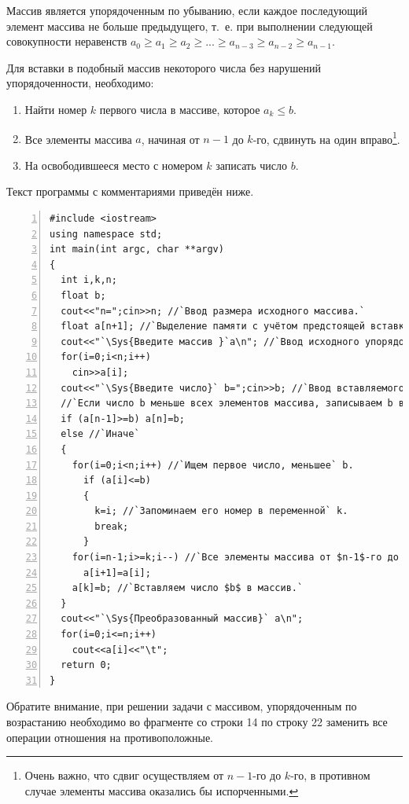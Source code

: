 Массив является упорядоченным по убыванию, если каждое последующий элемент массива не больше предыдущего, т.~е. при
выполнении следующей совокупности неравенств $a_0\geqslant a_1\geqslant a_2\geqslant ...\geqslant a_{n-3}\geqslant a_{n-2}\geqslant a_{n-1}$. 

Для вставки в подобный массив некоторого числа без нарушений упорядоченности, необходимо:

\begin{enumerate}
\item Найти номер $k$ первого числа в массиве, которое  $a_{k}\leqslant b$.
\item Все элементы массива $a$, начиная от $n-1$ до $k$-го, сдвинуть
на один вправо\footnote{Очень важно, что сдвиг осуществляем от $n-1$-го до $k$-го, в противном случае элементы массива
оказались бы испорченными.}.
\item На освободившееся место с номером $k$ записать число $b$.
\end{enumerate}
Текст программы с комментариями приведён ниже.
\begin{lstlisting}[numbers=left, numberstyle=\tiny, stepnumber=2, numbersep=5pt] 
#include <iostream>
using namespace std;
int main(int argc, char **argv)
{
  int i,k,n;
  float b;
  cout<<"n=";cin>>n; //`Ввод размера исходного массива.`
  float a[n+1]; //`Выделение памяти с учётом предстоящей вставки одного числа в массив.`
  cout<<"`\Sys{Введите массив }`a\n"; //`Ввод исходного упорядоченного по убыванию массива.`
  for(i=0;i<n;i++)
    cin>>a[i];
  cout<<"`\Sys{Введите число}` b=";cin>>b; //`Ввод вставляемого в массив числа b`.
  //`Если число b меньше всех элементов массива, записываем b в последний элемент массива.`
  if (a[n-1]>=b) a[n]=b;
  else //`Иначе`
  {
    for(i=0;i<n;i++) //`Ищем первое число, меньшее` b.
      if (a[i]<=b) 
      {
        k=i; //`Запоминаем его номер в переменной` k.
        break;
      }
    for(i=n-1;i>=k;i--) //`Все элементы массива от $n-1$-го до $k$-го сдвигаем на один вправо.`
      a[i+1]=a[i];
    a[k]=b; //`Вставляем число $b$ в массив.`
  }
  cout<<"`\Sys{Преобразованный массив}` a\n";
  for(i=0;i<=n;i++)
    cout<<a[i]<<"\t";
  return 0;
}
\end{lstlisting}

Обратите внимание, при решении задачи с массивом, упорядоченным по возрастанию необходимо во 
фрагменте со строки 14 по строку 22
заменить все операции отношения на противоположные.


